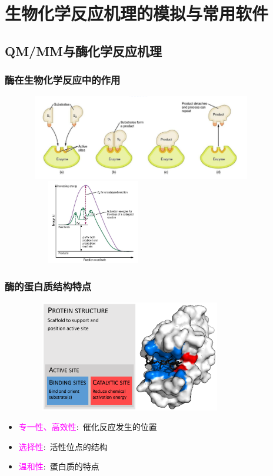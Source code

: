 \section{生物化学反应机理的模拟与常用软件}
\subsection{\rm{QM/MM}与酶化学反应机理}
\frame
{
	\frametitle{酶在生物化学反应中的作用}
\begin{figure}[h!]
\centering
\vspace{-5.5pt}
\includegraphics[height=1.45in,width=4.00in,viewport=0 0 800 310,clip]{Figures/enzyme-substrate-3.png}
\includegraphics[height=1.45in,width=2.30in,viewport=0 0 850 780,clip]{Figures/Reaction-with-catalyst.jpg}
\label{Bio-Chem-enzy}
\end{figure}
}

\frame
{
	\frametitle{酶的蛋白质结构特点}
\begin{figure}[h!]
\centering
\vspace{-10.5pt}
\includegraphics[height=1.90in,width=3.60in,viewport=0 0 1950 1200,clip]{Figures/Enzyme_structure.png}
\label{enzyem_Structure}
\end{figure}
\begin{itemize}
	\item \textcolor{magenta}{专一性、高效性}:~催化反应发生的位置
	\item \textcolor{magenta}{选择性}:~活性位点的结构
	\item \textcolor{magenta}{温和性}:~蛋白质的特点
\end{itemize}
}


